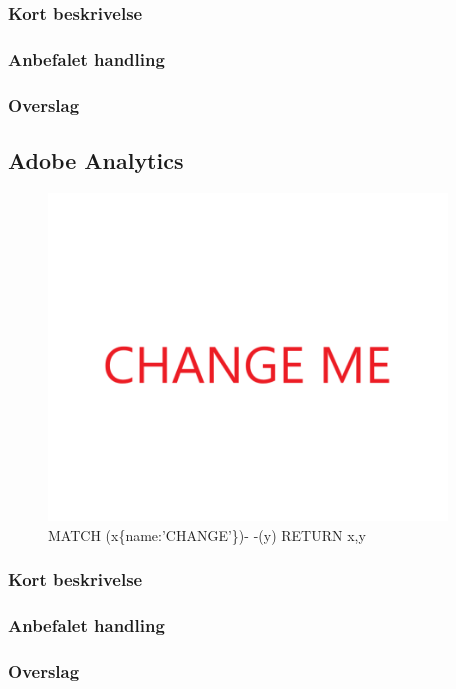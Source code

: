 \documentclass{article}
\begin{document}
\subsubsection{Kort beskrivelse}
\subsubsection{Anbefalet handling}
\subsubsection{Overslag}
\subsection{Adobe Analytics}
\begin{figure}[h]
\includegraphics[width=300pt]{CHANGE.PNG}
\caption{MATCH (x\{name:'CHANGE'\})- -(y) RETURN x,y}
\end{figure}
\subsubsection{Kort beskrivelse}
\subsubsection{Anbefalet handling}
\subsubsection{Overslag}
\end{document}
